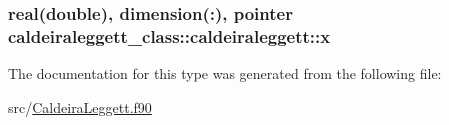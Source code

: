 \hypertarget{structcaldeiraleggett__class_1_1caldeiraleggett_a52f7919bcbd717bea7a549b320238a81}{
\subsubsection[{x}]{\setlength{\rightskip}{0pt plus 5cm}real(double), dimension(\+:), pointer caldeiraleggett\+\_\+class\+::caldeiraleggett\+::x\hspace{0.3cm}{\ttfamily [private]}}}\label{structcaldeiraleggett__class_1_1caldeiraleggett_a52f7919bcbd717bea7a549b320238a81}


The documentation for this type was generated from the following file\+:\begin{DoxyCompactItemize}
\item 
src/\hyperlink{_caldeira_leggett_8f90}{Caldeira\+Leggett.\+f90}\end{DoxyCompactItemize}
